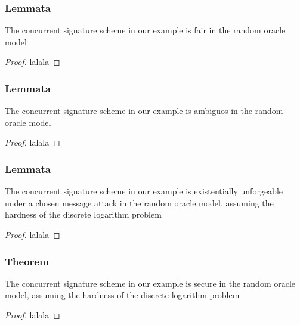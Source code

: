 \begin{frame}
	\frametitle{Lemmata}

	\begin{lemma}[Fairness]
		The concurrent signature scheme in our example is fair in the random oracle model
	\end{lemma}	
	\begin{proof}
		lalala
	\end{proof}

\end{frame}

\begin{frame}
	\frametitle{Lemmata}
	
	\begin{lemma}[Ambiguity]
		The concurrent signature scheme in our example is ambiguos in the random oracle model
	\end{lemma}	
	\begin{proof}
		lalala
	\end{proof}
\end{frame}

\begin{frame}
	\frametitle{Lemmata}

	\begin{lemma}[Unforgeability]
		The concurrent signature scheme in our example is existentially unforgeable under a chosen message attack in the random oracle model, assuming the hardness of the discrete logarithm problem
	\end{lemma}	
	\begin{proof}
		lalala
	\end{proof}
\end{frame}

\begin{frame}
	\frametitle{Theorem}

	\begin{theorem}
		The concurrent signature scheme in our example is secure in the random oracle model, assuming the hardness of the discrete logarithm problem
	\end{theorem}	
	\begin{proof}
		lalala
	\end{proof}
\end{frame}
